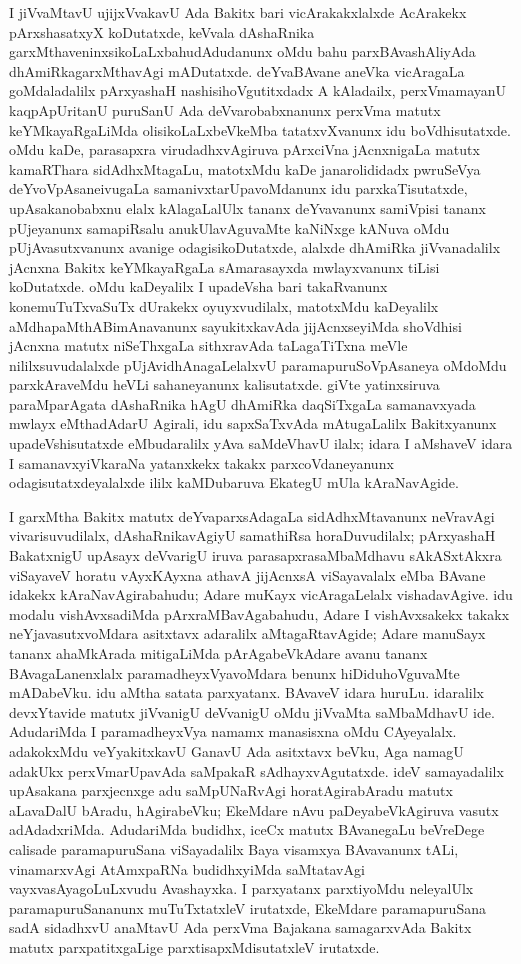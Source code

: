 I jiVvaMtavU ujijxVvakavU Ada Bakitx bari vicArakakxlalxde AcArakekx pArxshasatxyX koDu\-tatxde, keVvala dAshaRnika garxMthaveninxsikoLaLxbahudAdudanunx oMdu bahu parxBAvashAli\-yAda dhAmiRkagarxMthavAgi mADutatxde. deYvaBAvane aneVka vicAragaLa goMdaladalilx pArxyashaH nashisihoVgutitxdadx A kAladailx, perxVmamayanU kaqpApUritanU puruSanU Ada deVvarobabxnanunx perxVma matutx keYMkayaRgaLiMda olisikoLaLxbeVkeMba tatatxvXvanunx idu boVdhisutatxde. oMdu kaDe, parasapxra virudadhxvAgiruva pArxciVna jAcnxnigaLa matutx kamaRThara sidAdhxMtagaLu, matotxMdu kaDe janarolididadx pwruSeVya deYvoVpAsane\break ivugaLa samanivxtarUpavoMdanunx idu parxkaTisutatxde, upAsakanobabxnu elalx kAla\break\-gaLalUlx tananx deYvavanunx samiVpisi tananx pUjeyanunx samapiRsalu anukUlavAgu\-vaMte kaNiNxge kANuva oMdu pUjAvasutxvanunx avanige odagisikoDutatxde, alalxde dhAmiRka jiVvanadalilx jAcnxna Bakitx keYMkayaRgaLa sAmarasayxda mwlayxvanunx tiLisi koDutatxde. oMdu kaDeyalilx I upadeVsha bari takaRvanunx konemuTuTxvaSuTx dUrakekx oyuyxvudilalx, matotxMdu kaDeyalilx aMdhapaMthABimAnavanunx sayukitxkavAda jijAcnxseyiMda shoVdhisi jAcnxna matutx niSeThxgaLa sithxravAda taLagaTiTxna meVle nililxsuvudalalxde pUjAvidhAnagaLelalxvU paramapuruSoVpAsaneya oMdoMdu parxkAraveMdu heVLi sahaneyanunx kalisutatxde. giVte yatinxsiruva paraMparAgata dAshaRnika hAgU dhAmiRka daqSiTxgaLa samanavxyada mwlayx eMthadAdarU Agirali, idu sapxSaTxvAda mAtugaLalilx Bakitxyanunx upadeVshisutatxde eMbudaralilx yAva saMdeVhavU ilalx; idara I aMshaveV idara I samanavxyiVkaraNa yatanxkekx takakx parxcoVdaneyanunx odagisutatxdeyalalxde ililx kaMDubaruva EkategU mUla kAraNavAgide.

I garxMtha Bakitx matutx deYvaparxsAdagaLa sidAdhxMtavanunx neVravAgi vivarisuvudilalx, dAshaRnikavAgiyU samathiRsa horaDuvudilalx; pArxyashaH BakatxnigU upAsayx deVvarigU iruva parasapxrasaMbaMdhavu sAkASxtAkxra viSayaveV horatu vAyxKAyxna athavA jijAcnxsA viSayavalalx eMba BAvane idakekx kAraNavAgirabahudu; Adare muKayx vicAragaLelalx vishadavAgive. idu modalu vishAvxsadiMda pArxraMBavAgabahudu, Adare I vishAvxsakekx takakx neYjavasutxvoMdara asitxtavx adaralilx aMtagaRtavAgide; Adare manuSayx tananx ahaMkArada mitigaLiMda pArAgabeVkAdare avanu tananx BAvagaLanenxlalx paramadheyxVyavoMdara benunx hiDiduhoVguvaMte mADabeVku. idu aMtha satata parxyatanx. BAvaveV idara huruLu. idaralilx devxYtavide matutx jiVvanigU deVvanigU oMdu jiVvaMta saMbaMdhavU ide. AdudariMda I paramadheyxVya namamx manasisxna oMdu CAyeyalalx. adakokxMdu veYyakitxkavU GanavU Ada asitxtavx beVku, Aga namagU adakUkx perxVmarUpavAda saMpakaR sAdhayxvAgutatxde. ideV samayadalilx upAsakana parxjecnxge adu saMpUNaRvAgi horatAgirabAradu matutx aLavaDalU bAradu, hAgirabeVku; EkeMdare nAvu paDeyabeVkAgiruva vasutx adAdadxriMda. AdudariMda budidhx, iceCx matutx BAvanegaLu beVreDege calisade paramapuruSana viSayadalilx Baya visamxya BAvavanunx tALi, vinamarxvAgi AtAmxpaRNa budidhxyiMda saMtatavAgi vayxvasAyagoLuLxvudu Avashayxka. I parxyatanx parxtiyoMdu neleyalUlx paramapuruSananunx muTuTxtatxleV irutatxde, EkeMdare paramapuruSana sadA sidadhxvU anaMtavU Ada perxVma Bajakana samagarxvAda Bakitx matutx parxpatitxgaLige parxtisapxMdisutatxleV irutatxde.

